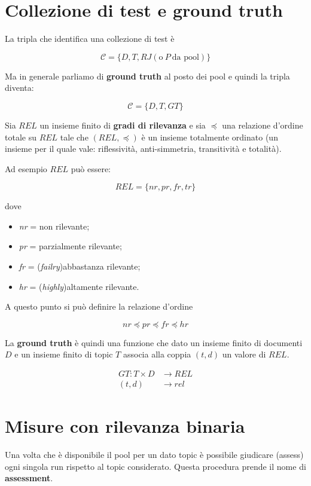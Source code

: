\section{Collezione di test e ground truth}

La tripla che identifica una collezione di test è

$$
\mathcal{C} = \{D, T, RJ (\text{o} \ P \ \text{da pool})\}
$$

\noindent Ma in generale parliamo di \textbf{ground truth} al posto dei pool e quindi la tripla diventa:

$$
\mathcal{C} = \{D, T, GT\}
$$

\noindent Sia $REL$ un insieme finito di \textbf{gradi di rilevanza} e sia $\preceq$ una relazione d'ordine totale su $REL$ tale che $(REL, \preceq)$ è un insieme totalmente ordinato (un insieme per il quale vale: riflessività, anti-simmetria, transitività e totalità).

Ad esempio $REL$ può essere:

$$
REL = \{nr, pr, fr, tr \}
$$

\noindent dove 
\begin{itemize}
	\item \textit{nr} = non rilevante;
	\item \textit{pr} = parzialmente rilevante;
	\item \textit{fr} = (\textit{failry})abbastanza rilevante;
	\item \textit{hr} = (\textit{highly})altamente rilevante.
\end{itemize}

\noindent A questo punto si può definire la relazione d'ordine

$$
nr \preceq pr \preceq fr \preceq hr
$$

La \textbf{ground truth} è quindi una funzione che dato un insieme finito di documenti $D$ e un insieme finito di topic $T$ associa alla coppia $(t,d)$ un valore di $REL$.

\begin{align*}
	GT : T \times D &\to REL \\
		(t,d) &\to rel
\end{align*}

\section{Misure con rilevanza binaria}

Una volta che è disponibile il pool per un dato topic è possibile giudicare (assess) ogni singola run rispetto al topic considerato.
Questa procedura prende il nome di \textbf{assessment}.

